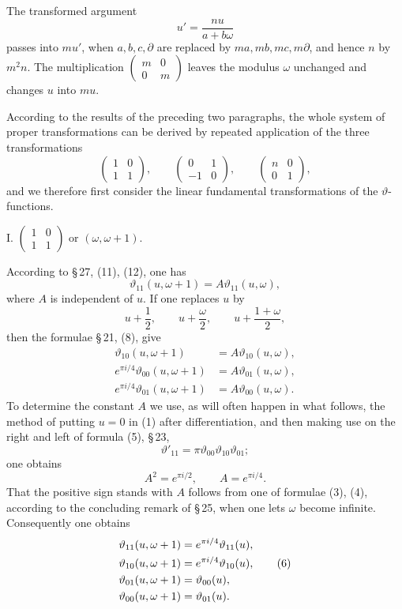 \documentclass[11pt]{article}
\providecommand{\tht}{\vartheta}
\begin{document}
The transformed argument
\[
u'=\frac{nu}{a+b\omega}
\]
passes into $mu'$, when $a,b,c,\partial$ are replaced by $ma,mb,mc,m\partial$, and hence $n$ by $m^2n$. The multiplication $\begin{pmatrix}m&0\\0&m\end{pmatrix}$ leaves the modulus $\omega$ unchanged and changes $u$ into $mu$.

According to the results of the preceding two paragraphs, the whole system of proper transformations can be derived by repeated application of the three transformations
\[
\begin{pmatrix}1&0\\1&1\end{pmatrix},
\qquad
\begin{pmatrix}0&1\\-1&0\end{pmatrix},
\qquad
\begin{pmatrix}n&0\\0&1\end{pmatrix},
\]
and we therefore first consider the linear fundamental transformations of the $\tht$-functions.

I. $\begin{pmatrix}1&0\\1&1\end{pmatrix}$ or $(\omega,\omega+1)$.

According to \S\,27, (11), (12), one has
\begin{equation}
\tht_{11}(u,\omega+1)=A\tht_{11}(u,\omega), \tag{1}
\end{equation}
where $A$ is independent of $u$. If one replaces $u$ by
\[
u+\frac12,
\qquad u+\frac{\omega}{2},
\qquad u+\frac{1+
\omega}{2},
\]
then the formulae \S\,21, (8), give
\begin{align}
\tht_{10}(u,\omega+1)&=A\tht_{10}(u,\omega), \tag{2}\\
e^{\pi i/4}\tht_{00}(u,\omega+1)&=A\tht_{01}(u,\omega), \tag{3}\\
e^{\pi i/4}\tht_{01}(u,\omega+1)&=A\tht_{00}(u,\omega). \tag{4}
\end{align}
To determine the constant $A$ we use, as will often happen in what follows, the method of putting $u=0$ in (1) after differentiation, and then making use on the right and left of formula (5), \S\,23,
\begin{equation}
\tht'_{11}=\pi\tht_{00}\tht_{10}\tht_{01}; \tag{5}
\end{equation}
one obtains
\[
A^2=e^{\pi i/2},
\qquad
A=e^{\pi i/4}.
\]
That the positive sign stands with $A$ follows from one of formulae (3), (4), according to the concluding remark of \S\,25, when one lets $\omega$ become infinite. Consequently one obtains
\begin{align}
\tht_{11}(u,\omega+1)&=e^{\pi i/4}\tht_{11}(u),\notag\\
\tht_{10}(u,\omega+1)&=e^{\pi i/4}\tht_{10}(u), \tag{6}\\
\tht_{01}(u,\omega+1)&=\tht_{00}(u),\notag\\
\tht_{00}(u,\omega+1)&=\tht_{01}(u).\notag
\end{align}
\end{document}
